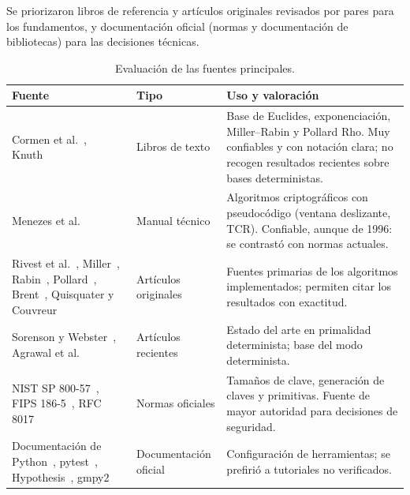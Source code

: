 Se priorizaron libros de referencia y artículos originales revisados por
pares para los fundamentos, y documentación oficial (normas y documentación
de bibliotecas) para las decisiones técnicas.

\begin{table}[H]
\centering\small
\caption{Evaluación de las fuentes principales.}
\label{tab:fuentes}
\begin{tabularx}{\textwidth}{@{}>{\raggedright}p{4.1cm} >{\raggedright}p{2.4cm} Y@{}}
\toprule
\textbf{Fuente} & \textbf{Tipo} & \textbf{Uso y valoración}\\
\midrule
Cormen et al.~\cite{clrs}, Knuth~\cite{knuth} & Libros de texto & Base de Euclides, exponenciación,
Miller--Rabin y Pollard Rho. Muy confiables y con notación clara; no recogen resultados
recientes sobre bases deterministas.\\
Menezes et al.~\cite{hac} & Manual técnico & Algoritmos criptográficos con pseudocódigo
(ventana deslizante, TCR). Confiable, aunque de 1996: se contrastó con normas actuales.\\
Rivest et al.~\cite{rsa1978}, Miller~\cite{miller1976}, Rabin~\cite{rabin1980},
Pollard~\cite{pollard1975}, Brent~\cite{brent1980}, Quisquater y Couvreur~\cite{qc1982} &
Artículos originales & Fuentes primarias de los algoritmos implementados; permiten citar los
resultados con exactitud.\\
Sorenson y Webster~\cite{sorenson2017}, Agrawal et al.~\cite{aks2004} & Artículos recientes &
Estado del arte en primalidad determinista; base del modo determinista.\\
NIST SP 800-57~\cite{nist80057}, FIPS 186-5~\cite{fips186}, RFC 8017~\cite{rfc8017} & Normas
oficiales & Tamaños de clave, generación de claves y primitivas. Fuente de mayor autoridad para
decisiones de seguridad.\\
Documentación de Python~\cite{pydocs}, pytest~\cite{pytest}, Hypothesis~\cite{hypothesis},
gmpy2~\cite{gmpy2} & Documentación oficial & Configuración de herramientas; se prefirió a
tutoriales no verificados.\\
\bottomrule
\end{tabularx}
\end{table}

